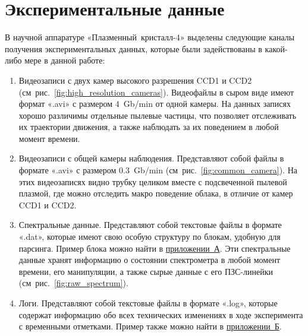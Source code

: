 \section{Экспериментальные данные}
\label{cha:ch_3_4}
В научной аппаратуре «Плазменный~кристалл-4» выделены следующие каналы получения экспериментальных данных,
которые были задействованы в какой-либо мере в данной работе:
\begin{enumerate}
    \item Видеозаписи с двух камер высокого разрешения CCD1 и CCD2 (см~рис.~\ref{fig:high_resolution_cameras}).
    Видеофайлы в сыром виде имеют формат «.avi» с размером 4~Gb/min от одной камеры. На данных записях хорошо
    различимы отдельные пылевые частицы, что позволяет отслеживать их траектории движения, а также наблюдать за
    их поведением в любой момент времени.

    \item Видеозаписи с общей камеры наблюдения. Представляют собой файлы в формате «.avi» с размером 0.3~Gb/min (см~рис.~\ref{fig:common_camera}).
    На этих видеозаписях видно трубку целиком вместе с подсвеченной пылевой плазмой, где можно отследить макро поведение
    облака, в отличие от камер CCD1 и CCD2.

    \item Спектральные данные. Представляют собой текстовые файлы в формате «.dat», которые имеют свою особую структуру
    по блокам, удобную для парсинга. Пример блока можно найти в \hyperref[app:app1]{приложении~А}. Эти спектральные данные
    хранят информацию о состоянии спектрометра в любой момент времени, его манипуляции, а также сырые данные с его ПЗС-линейки (см~рис.~\ref{fig:raw_spectrum}).

    \item Логи. Представляют собой текстовые файлы в формате «.log», которые содержат информацию обо всех
    технических изменениях в ходе эксперимента с временными отметками. Пример также можно найти в \hyperref[app:app2]{приложении~Б}.
\end{enumerate}
